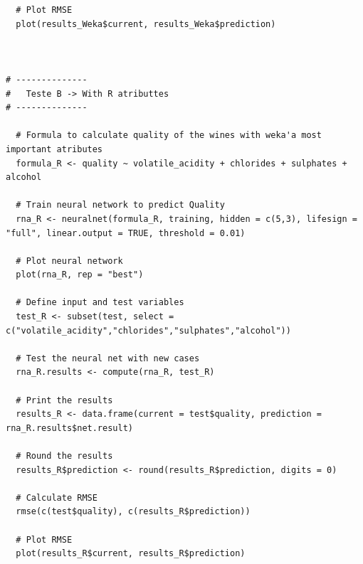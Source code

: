 \documentclass{report}
\begin{document}
\begin{verbatim}
  # Plot RMSE
  plot(results_Weka$current, results_Weka$prediction)



# --------------
#	Teste B	-> With R atributtes
# --------------

  # Formula to calculate quality of the wines with weka'a most important atributes
  formula_R <- quality ~ volatile_acidity + chlorides + sulphates + alcohol
  
  # Train neural network to predict Quality
  rna_R <- neuralnet(formula_R, training, hidden = c(5,3), lifesign = "full", linear.output = TRUE, threshold = 0.01)
  
  # Plot neural network
  plot(rna_R, rep = "best")
  
  # Define input and test variables
  test_R <- subset(test, select = c("volatile_acidity","chlorides","sulphates","alcohol"))
  
  # Test the neural net with new cases
  rna_R.results <- compute(rna_R, test_R)
  
  # Print the results
  results_R <- data.frame(current = test$quality, prediction = rna_R.results$net.result)
  
  # Round the results
  results_R$prediction <- round(results_R$prediction, digits = 0)
  
  # Calculate RMSE
  rmse(c(test$quality), c(results_R$prediction))
  
  # Plot RMSE
  plot(results_R$current, results_R$prediction)
\end{verbatim}
\end{document}

